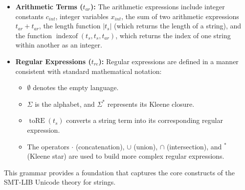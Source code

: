 \begin{itemize}
\begin{itemize}
		\item \textbf{\(StrRep\):}  
		Contains the string replacement functions, abbreviated here for conciseness. They include:
		\begin{itemize}
			\item \(\operatorname{rep}(t_s, t_s, t_s)\): Literal replacement.
			\item \(\operatorname{rep\_all}(t_s, t_s, t_s)\): Replace all occurrences (literal).
			\item \(\operatorname{rep\_re}(t_s, t_{\mathit{re}}, t_s)\): Regex-based replacement.
			\item \(\operatorname{rep\_re\_all}(t_s, t_{\mathit{re}}, t_s)\): Replace all occurrences based on a regex.
		\end{itemize}
	\end{itemize}
	
	\item \textbf{Arithmetic Terms (\(t_{\mathit{ar}}\)):}  
	The arithmetic expressions include integer constants \(c_{\mathit{int}}\), integer variables \(x_{\mathit{int}}\), the sum of two arithmetic expressions \(t_{\mathit{ar}} + t_{\mathit{ar}}\), the length function \(\lvert t_s \rvert\) (which returns the length of a string), and the function \(\operatorname{indexof}(t_s, t_s, t_{\mathit{ar}})\), which returns the index of one string within another as an integer.
	
	\item \textbf{Regular Expressions (\(t_{\mathit{re}}\)):}  
	Regular expressions are defined in a manner consistent with standard mathematical notation:
	\begin{itemize}
		\item \(\emptyset\) denotes the empty language.
		\item \(\Sigma\) is the alphabet, and \(\Sigma^*\) represents its Kleene closure.
		\item \(\operatorname{toRE}(t_s)\) converts a string term into its corresponding regular expression.
		\item The operators \(\cdot\) (concatenation), \(\cup\) (union), \(\cap\) (intersection), and \(^*\) (Kleene star) are used to build more complex regular expressions.
	\end{itemize}
\end{itemize}


This grammar provides a foundation that captures the core constructs of the SMT-LIB Unicode theory for strings. 
